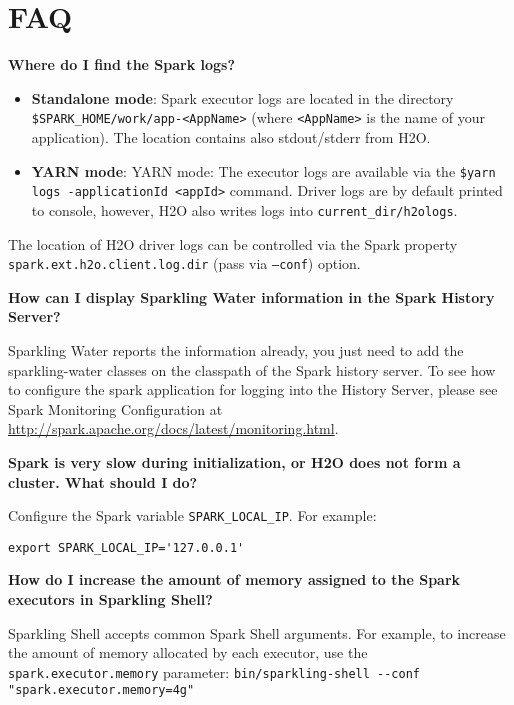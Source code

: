 \section{FAQ}

\textbf{Where do I find the Spark logs?}

\begin{itemize}
    \item \textbf{Standalone mode}: Spark executor logs are located in the directory {\lstinline[style=Bash]|$SPARK_HOME/work/app-<AppName>|} (where \texttt{<AppName>} is the name of your application). The location contains also stdout/stderr from H2O.
    \item \textbf{YARN mode}: YARN mode: The executor logs are available via the {\lstinline[style=Bash]|$yarn logs -applicationId <appId>|} command. Driver logs are by default printed to console, however, H2O also writes logs into \texttt{current\_dir/h2ologs}.
\end{itemize}

The location of H2O driver logs can be controlled via the Spark property \\ \texttt{spark.ext.h2o.client.log.dir} (pass via \texttt{--conf}) option.

\textbf{How can I display Sparkling Water information in the Spark History Server?}

Sparkling Water reports the information already, you just need to add the sparkling-water classes on the classpath of the Spark history server. To see how to configure the spark application for logging into the History Server, please see Spark Monitoring Configuration at
\url{http://spark.apache.org/docs/latest/monitoring.html}.

\textbf{Spark is very slow during initialization, or H2O does not form a cluster. What should I do?}

Configure the Spark variable \texttt{SPARK\_LOCAL\_IP}. For example:
       
\begin{lstlisting}[style=Bash]
export SPARK_LOCAL_IP='127.0.0.1'
\end{lstlisting}

\textbf{How do I increase the amount of memory assigned to the Spark executors in Sparkling Shell?}

Sparkling Shell accepts common Spark Shell arguments. For example, to increase the amount of memory allocated by each executor,
use the \\ \texttt{spark.executor.memory} parameter: {\lstinline[style=Bash]|bin/sparkling-shell --conf "spark.executor.memory=4g"|}

